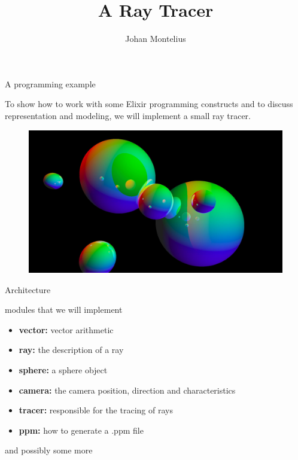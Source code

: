 

\title[ID1019 Ray Tracer]{A Ray Tracer}
 
 
\author{Johan Montelius}
\date{\semester}



\begin{frame}
\titlepage
\end{frame}

\begin{frame}{A programming example}

To show how to work with some Elixir programming constructs and to
discuss representation and modeling, we will implement a small ray tracer. 

\pause \vspace{20pt}

\begin{figure}
 \includegraphics[scale=0.1]{world.jpg}
\end{figure}

\end{frame}

\begin{frame}{Architecture}

modules that we will implement

\begin{itemize}
 \item {\bf vector:} vector arithmetic
 \item {\bf ray:} the description of a ray
 \item {\bf sphere:} a sphere object 
 \item {\bf camera:} the camera position, direction and characteristics
 \item {\bf tracer:} responsible for the tracing of rays 
 \item {\bf ppm:} how to generate a .ppm file
\end{itemize}

\pause and possibly some more

\end{frame}


